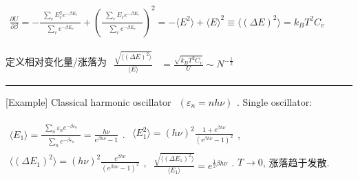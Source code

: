 \documentclass[../../main.tex]{subfiles}
\begin{document}
$\begin{aligned}
    \frac{\partial U}{\partial\beta} = -\frac{\begin{aligned}
        \sum_{r}E_{r}^{2}e^{-\beta E_{r}}
    \end{aligned}}{\begin{aligned}
        \sum_{r}e^{-\beta E_{r}}
    \end{aligned}} + \left(\frac{\begin{aligned}
        \sum_{r}E_{r}e^{-\beta E_{r}}
    \end{aligned}}{\begin{aligned}
        \sum_{r}e^{-\beta E_{r}}
    \end{aligned}}\right)^{2}= -\langle E^{2}\rangle + \langle E\rangle^{2}
    \equiv \langle(\Delta E)^{2}\rangle = k_{B}T^{2}C_{v}
\end{aligned}$

定义相对变化量/涨落为 $\begin{aligned}
    \frac{\sqrt{\langle(\Delta E)^{2}\rangle}}{\langle E\rangle} &= \frac{\sqrt{k_{B}T^{2}C_{v}}}{U}\sim N^{-\frac{1}{2}}
\end{aligned}$

\vspace{0.5em}\hrule\vspace{0.5em}
[Example] Classical harmonic oscillator $\begin{aligned}
    (\varepsilon_{n} = nh\nu)
\end{aligned}$. Single oscillator: 

$\begin{aligned}
    \langle E_{1}\rangle = \frac{\begin{aligned}
        \sum_{n}\varepsilon_{n}e^{-\beta\varepsilon_{n}}
    \end{aligned}}{\begin{aligned}
        \sum_{n}e^{-\beta\varepsilon_{n}}
    \end{aligned}} = \frac{h\nu}{e^{\beta h\nu}-1}
\end{aligned}$. $\begin{aligned}
    \langle E_{1}^{2}\rangle = (h\nu)^{2}\frac{1+e^{\beta h\nu}}{(e^{\beta h\nu}-1)^{2}}
\end{aligned}$, $\begin{aligned}
    \langle(\Delta E_{1})^{2}\rangle = (h\nu)^{2}\frac{e^{\beta h\nu}}{(e^{\beta h\nu}-1)^{2}}
\end{aligned}$, $\begin{aligned}
    \frac{\sqrt{\langle (\Delta E_{1})^{2}\rangle}}{\langle E_{1}\rangle} = e^{\frac{1}{2}\beta h\nu}
\end{aligned}$. $T\rightarrow 0$, 涨落趋于发散. 
\end{document}
